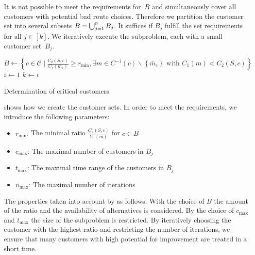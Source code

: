 It is not possible to meet the requirements for~$B$ and simultaneously cover all customers with potential bad route choices. Therefore we partition the customer set into several subsets ${B=\bigcup_{j=1}^n B_j}$. It suffices if $B_j$ fulfill the set requirements for all ${j\in[k]}$. We iteratively execute the subproblem, each with a small customer set~$B_j$.

\begin{algorithm}[htb]
	\SetAlgoLined
	$B\gets\left\{c\in\mathcal{C}\mid\frac{C_2(S,c)}{C_1\left(\bar{m}_c\right)}\geq r_{\min}, \exists m\in C^{-1}(c)\backslash\left\{\bar{m}_c\right\} \text{ with } C_1(m)<C_2(S,c)\right\}$\;
	$i\gets 1$\;
	$k\gets i$\;
	\caption{Determination of critical customers}
	\label{alg:critical_customers}
\end{algorithm}

 shows how we create the customer sets. In order to meet the requirements, we introduce the following parameters:
\begin{itemize}
	\item{$r_{\min}$:} The minimal ratio $\frac{C_2(S,c)}{C_1\left(\bar{m}\right)}$ for ${c\in B}$
	\item{$c_{\max}$:} The maximal number of customers in $B_j$
	\item{$t_{\max}$:} The maximal time range of the customers in $B_j$
	\item{$n_{\max}$:} The maximal number of iterations
\end{itemize}

The properties taken into account by  as follows: With the choice of $B$ the amount of the ratio and the availability of alternatives is considered. By the choice of $c_{\max}$ and $t_{\max}$ the size of the subproblem is restricted. By iteratively choosing the customer with the highest ratio and restricting the number of iterations, we ensure that many customers with high potential for improvement are treated in a short time.

